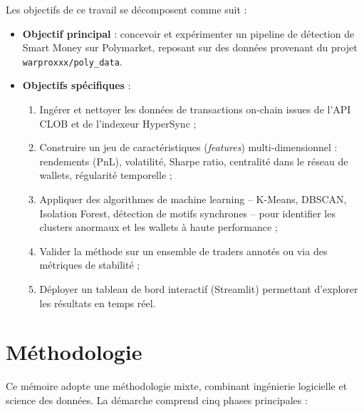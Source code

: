 Les objectifs de ce travail se décomposent comme suit :

\begin{itemize}
  \item \textbf{Objectif principal} : concevoir et expérimenter un pipeline de détection de Smart Money sur Polymarket, reposant sur des données provenant du projet \texttt{warproxxx/poly\_data}.
  \item \textbf{Objectifs spécifiques} :
  \begin{enumerate}
    \item Ingérer et nettoyer les données de transactions on-chain issues de l'API CLOB et de l'indexeur HyperSync ;
    \item Construire un jeu de caractéristiques (\textit{features}) multi-dimensionnel : rendements (PnL), volatilité, Sharpe ratio, centralité dans le réseau de wallets, régularité temporelle ;
    \item Appliquer des algorithmes de machine learning -- K-Means, DBSCAN, Isolation Forest, détection de motifs synchrones -- pour identifier les clusters anormaux et les wallets à haute performance ;
    \item Valider la méthode sur un ensemble de traders annotés ou via des métriques de stabilité ;
    \item Déployer un tableau de bord interactif (Streamlit) permettant d'explorer les résultats en temps réel.
  \end{enumerate}
\end{itemize}

\section{Méthodologie}

Ce mémoire adopte une méthodologie mixte, combinant ingénierie logicielle et science des données. La démarche comprend cinq phases principales :

